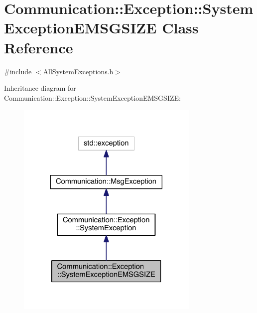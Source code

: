 \hypertarget{class_communication_1_1_exception_1_1_system_exception_e_m_s_g_s_i_z_e}{}\section{Communication\+:\+:Exception\+:\+:System\+Exception\+E\+M\+S\+G\+S\+I\+Z\+E Class Reference}
\label{class_communication_1_1_exception_1_1_system_exception_e_m_s_g_s_i_z_e}


{\ttfamily \#include $<$All\+System\+Exceptions.\+h$>$}



Inheritance diagram for Communication\+:\+:Exception\+:\+:System\+Exception\+E\+M\+S\+G\+S\+I\+Z\+E\+:\nopagebreak
\begin{figure}[H]
\begin{center}
\leavevmode
\includegraphics[width=248pt]{class_communication_1_1_exception_1_1_system_exception_e_m_s_g_s_i_z_e__inherit__graph}
\end{center}
\end{figure}


